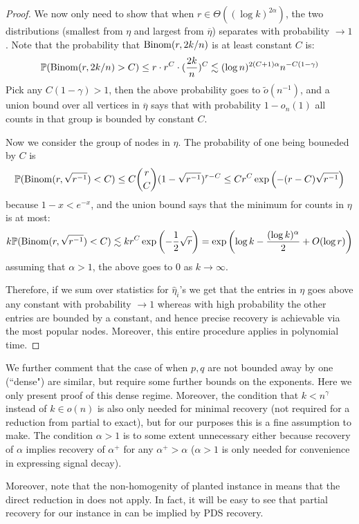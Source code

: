 \documentclass[final,12pt]{colt2023} %
\newcommand\1[1]{\mathbb{I}_{\left\{#1\right\}}}
\begin{document}
\begin{proof}
\spac We now only need to show that when $r\in\Theta((\log k)^{2\alpha})$, the two distributions (smallest from $\eta$ and largest from $\overline \eta$) separates with probability $\to 1$. Note that the probability that ${\rm Binom}(r, 2k/n)$ is at least constant $C$ is:
$$\mathbb{P}({\rm Binom}(r, 2k/n)>C)\leq r\cdot r^C\cdot (\frac{2k}{n})^C\lesssim (\log n)^{2(C+1)\alpha}n^{-C(1-\gamma)}$$
Pick any $C(1-\gamma)>1$, then the above probability goes to $\tilde o(n^{-1})$, and a union bound over all vertices in $\overline{\eta}$ says that with probability $1-o_n(1)$ all counts in that group is bounded by constant $C$.

\spac Now we consider the group of nodes in $\eta$. The probability of one being bouneded by $C$ is 
$$\mathbb{P}({\rm Binom}(r, \sqrt{r^{-1}})<C)\leq C{r\choose C}(1-\sqrt{r^{-1}})^{r-C}\leq Cr^C\exp\left(-(r-C)\sqrt{r^{-1}}\right)$$because $1-x<e^{-x}$, and the union bound says that the minimum for counts in $\eta$ is at most:
$$k\mathbb{P}({\rm Binom}(r, \sqrt{r^{-1}})<C)\lesssim kr^{C}\exp\left(-\frac{1}{2}\sqrt{r}\right)=\exp\left(\log k-\frac{(\log k)^{\alpha}}{2}+O(\log r)\right) $$
assuming that $\alpha>1$, the above goes to $0$ as $k\to\infty$.

\spac Therefore, if we sum over statistics for $\hat \eta_i$'s we get that the entries in $\eta$ goes above any constant with probability $\to 1$ whereas with high probability the other entries are bounded by a constant, and hence precise recovery is achievable via the most popular nodes. Moreover, this entire procedure applies in polynomial time.
\end{proof}
We further comment that the case of when $p, q$ are not bounded away by one (``dense") are similar, but require some further bounds on the exponents. Here we only present proof of this dense regime. Moreover, the condition that $k<n^{\gamma}$ instead of $k\in o(n)$ is also only needed for minimal recovery (not required for a reduction from partial to exact), but for our purposes this is a fine assumption to make. The condition $\alpha>1$ is to some extent unnecessary either because recovery of $\alpha$ implies recovery of $\alpha^{+}$ for any $\alpha^{+}>\alpha$ ($\alpha>1$ is only needed for convenience in expressing signal decay).

\spac Moreover, note that the non-homogenity of planted instance in  means that the direct reduction in  does not apply. In fact, it will be easy to see that partial recovery for our instance in  can be implied by PDS recovery.
\end{document}
